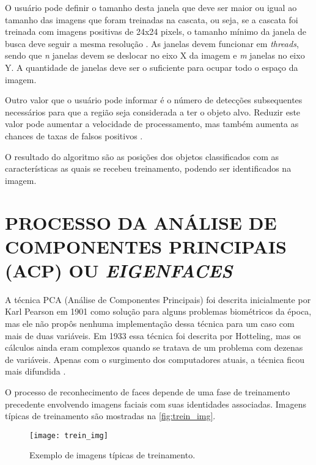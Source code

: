 O usuário pode definir o tamanho desta janela que deve ser maior ou igual ao tamanho das imagens que foram treinadas na cascata, ou seja, se a cascata foi treinada com imagens positivas de 24x24 pixels, o tamanho mínimo da janela de busca deve seguir a mesma resolução \cite{gustavo_cascata}. As janelas devem funcionar em \textit{threads}, sendo que \textit{n} janelas devem se deslocar no eixo X da imagem e \textit{m} janelas no eixo Y. A quantidade de janelas deve ser o suficiente para ocupar todo o espaço da imagem.

Outro valor que o usuário pode informar é o número de detecções subsequentes necessários para que a região seja considerada a ter o objeto alvo. Reduzir este valor pode aumentar a velocidade de processamento, mas também aumenta as chances de taxas de falsos positivos \cite{drmathew_java_programming}.

O resultado do algoritmo são as posições dos objetos classificados com as características as quais se recebeu treinamento, podendo ser identificados na imagem.




\section{PROCESSO DA ANÁLISE DE COMPONENTES PRINCIPAIS (ACP) OU \textit{EIGENFACES} } \label{sec:recog_faces}

A técnica PCA (Análise de Componentes Principais) foi descrita inicialmente por Karl Pearson em 1901 como solução para alguns problemas biométricos da época, mas ele não propôs nenhuma implementação dessa técnica para um caso com mais de duas variáveis. Em 1933 essa técnica foi descrita por Hotteling, mas os cálculos ainda eram complexos quando se tratava de um problema com dezenas de variáveis. Apenas com o surgimento dos computadores atuais, a técnica ficou mais difundida \cite{geysilva}. 

O processo de reconhecimento de faces depende de uma fase de treinamento precedente envolvendo imagens faciais com suas identidades associadas. Imagens típicas de treinamento são mostradas na \autoref{fig:trein_img}.
\begin{figure}[h]
	\centering
	\texttt{[image: trein\_img]}
	\caption{Exemplo de imagens típicas de treinamento.}
	\label{fig:trein_img}
\end{figure}

